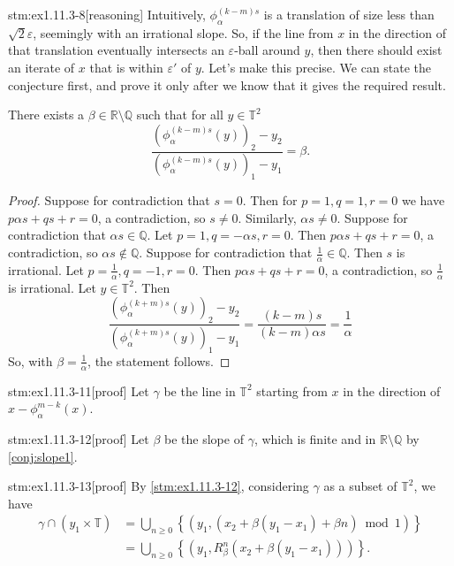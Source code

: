 \begin{stm}{stm:ex1.11.3-8}[reasoning]
Intuitively, $\phi_\alpha^{(k-m)s}$ is a translation of size less than $\sqrt{2} \varepsilon$, seemingly with an irrational slope. So, if the line from $x$ in the direction of that translation eventually intersects an $\varepsilon$-ball around $y$, then there should exist an iterate of $x$ that is within $\varepsilon'$ of $y$. Let's make this precise. We can state the conjecture first, and prove it only after we know that it gives the required result.
\end{stm}

\begin{conj}\label{conj:slope1}
There exists a  $\beta \in \mathbb{R} \setminus \mathbb{Q}$ such that for all $y \in \mathbb{T}^2$
\[
\frac{(\phi_\alpha^{(k-m)s}(y))_2 - y_2}{(\phi_\alpha^{(k-m)s}(y))_1 - y_1} = \beta.
\]
\end{conj}

\begin{proof}
    Suppose for contradiction that $s = 0$. Then for $p = 1, q = 1, r = 0$ we have $p \alpha s + q s + r = 0$, a contradiction, so $s \ne 0$. Similarly, $\alpha s \ne 0$. Suppose for contradiction that $\alpha s \in \mathbb{Q}$. Let $p = 1, q = -\alpha s, r = 0$. Then $p \alpha s + q s + r = 0$, a contradiction, so $\alpha s \not\in \mathbb{Q}$. Suppose for contradiction that $\frac{1}{\alpha} \in \mathbb{Q}$. Then $s$ is irrational. Let $p = \frac{1}{\alpha}, q = -1, r = 0$. Then $p \alpha s + q s + r = 0$, a contradiction, so $\frac{1}{\alpha}$ is irrational. Let $y \in \mathbb{T}^2$. Then $$\frac{(\phi_\alpha^{(k+m)s}(y))_2 - y_2}{(\phi_\alpha^{(k+m)s}(y))_1 - y_1} = \frac{(k-m)s}{(k-m)\alpha s} = \frac{1}{\alpha}$$
    So, with $\beta = \frac{1}{\alpha}$, the statement follows.
\end{proof}

\begin{stm}{stm:ex1.11.3-11}[proof]
Let $\gamma$ be the line in $\mathbb{T}^2$ starting from $x$ in the direction of $x - \phi_\alpha^{m-k}(x)$.
\end{stm}

\begin{stm}{stm:ex1.11.3-12}[proof]
Let $\beta$ be the slope of $\gamma$, which is finite and in $\mathbb{R} \setminus \mathbb{Q}$ by \ref{conj:slope1}.
\end{stm}

\begin{stm}{stm:ex1.11.3-13}[proof]
By \ref{stm:ex1.11.3-12}, considering $\gamma$ as a subset of $\mathbb{T}^2$, we have
\begin{align*}
\gamma \cap (y_1 \times \mathbb{T})
&= \bigcup_{n \ge 0} \left\{ \left( y_1, (x_2 + \beta(y_1 - x_1) + \beta n) \bmod 1 \right) \right\} \\
&= \bigcup_{n \ge 0} \left\{ \left( y_1, R_\beta^n(x_2 + \beta(y_1 - x_1)) \right) \right\}.
\end{align*}
\end{stm}


